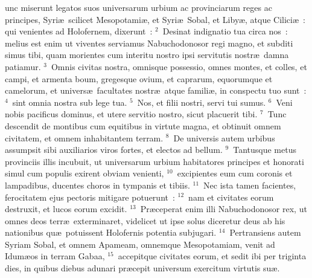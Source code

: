 \bchapter
{}unc miserunt legatos suos universarum urbium ac provinciarum reges ac principes, Syri\ae\ scilicet Mesopotami\ae , et Syri\ae\ Sobal, et Liby\ae , atque Cilici\ae~: qui venientes ad Holofernem, dixerunt~:
${}^{2}$~Desinat indignatio tua circa nos~: melius est enim ut viventes serviamus Nabuchodonosor regi magno, et subditi simus tibi, quam morientes cum interitu nostro ipsi servitutis nostr\ae\ damna patiamur.
${}^{3}$~Omnis civitas nostra, omnisque possessio, omnes montes, et colles, et campi, et armenta boum, gregesque ovium, et caprarum, equorumque et camelorum, et univers\ae\ facultates nostr\ae\ atque famili\ae , in conspectu tuo sunt~:
${}^{4}$~sint omnia nostra sub lege tua.
${}^{5}$~Nos, et filii nostri, servi tui sumus.
${}^{6}$~Veni nobis pacificus dominus, et utere servitio nostro, sicut placuerit tibi.
${}^{7}$~Tunc descendit de montibus cum equitibus in virtute magna, et obtinuit omnem civitatem, et omnem inhabitantem terram.
${}^{8}$~De universis autem urbibus assumpsit sibi auxiliarios viros fortes, et electos ad bellum.
${}^{9}$~Tantusque metus provinciis illis incubuit, ut universarum urbium habitatores principes et honorati simul cum populis exirent obviam venienti,
${}^{10}$~excipientes eum cum coronis et lampadibus, ducentes choros in tympanis et tibiis.
${}^{11}$~Nec ista tamen facientes, ferocitatem ejus pectoris mitigare potuerunt~:
${}^{12}$~nam et civitates eorum destruxit, et lucos eorum excidit.
${}^{13}$~Pr\ae ceperat enim illi Nabuchodonosor rex, ut omnes deos terr\ae\ exterminaret, videlicet ut ipse solus diceretur deus ab his nationibus qu\ae\ potuissent Holofernis potentia subjugari.
${}^{14}$~Pertransiens autem Syriam Sobal, et omnem Apameam, omnemque Mesopotamiam, venit ad Idum\ae os in terram Gabaa,
${}^{15}$~accepitque civitates eorum, et sedit ibi per triginta dies, in quibus diebus adunari pr\ae cepit universum exercitum virtutis su\ae .

